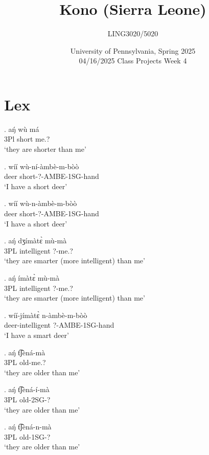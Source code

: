 \documentclass{assets/fieldnotes}
\title{Kono (Sierra Leone)}
\author{LING3020/5020}
\date{University of Pennsylvania, Spring 2025\\04/16/2025 Class Projects Week 4}
\begin{document}
\maketitle

\maketitle
\tableofcontents

\section{Lex}
\exg. aŋ́ wù má\\
3Pl short me.?\\
`they are shorter than me' 


\exg. wíí wù-ní-àmbè-m-bòò\\
deer short-?-AMBE-1SG-hand\\
`I have a short deer' 

\exg. wíí   wù-n-àmbè-m-bòò\\
      deer  short-?-AMBE-1SG-hand\\
`I have a short deer'

\exg. aŋ́ dʒímàtɛ̀ mù-mà\\
3PL intelligent ?-me.?\\
`they are smarter (more intelligent) than me' 

\exg. aŋ́ ímàtɛ̀  mù-mà\\
3PL intelligent ?-me.?\\
`they are smarter (more intelligent) than me' 

\exg. wíí-jímàtɛ̀ n-àmbè-m-bòò\\
deer-intelligent ?-AMBE-1SG-hand\\
`I have a smart deer'

\exg. aŋ́ t͡ʃèná-mà\\
3PL old-me.?\\
`they are older than me'

\exg. aŋ́ t͡ʃèná-í-mà\\
3PL old-2SG-?\\
`they are older than me'

\exg. aŋ́ t͡ʃèná-n-mà\\
3PL old-1SG-?\\
`they are older than me'

\end{document}
